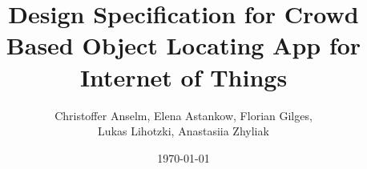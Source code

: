 \title{Design Specification for Crowd Based Object Locating App for Internet of Things}
\author{Christoffer Anselm, Elena Astankow, Florian Gilges,\\
	Lukas Lihotzki, Anastasiia Zhyliak}
\date{\today}

\titlehead{\centering\texttt{[image: img/groupLogo/BLELoc-Logo]}\\[\baselineskip]
	{\Huge BLEloc}}
